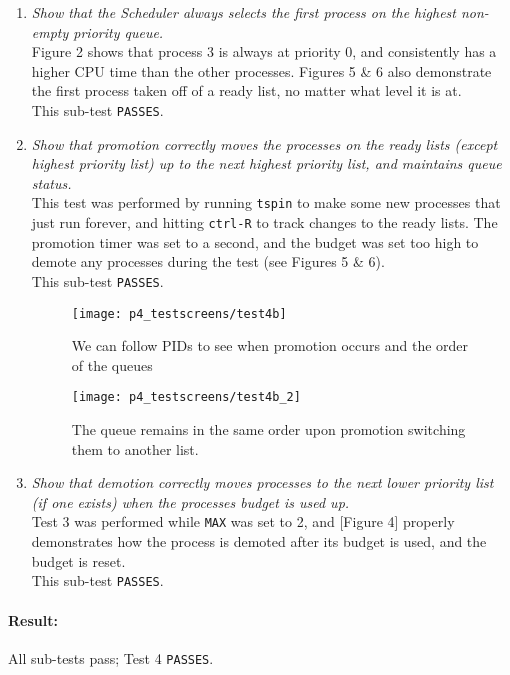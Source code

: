 \documentclass[11pt,letterpaper]{report}
\begin{document}
	\begin{enumerate}
		\item \emph{Show that the Scheduler always selects the first process on the highest non-empty priority queue.}\\
		{\color{red}Figure 2} shows that process 3 is always at priority 0, and consistently has a higher CPU time than the other processes. {\color{red}Figures 5 \& 6} also demonstrate the first process taken off of a ready list, no matter what level it is at.\\
		This sub-test {\tt PASSES}.
		
		\item \emph{Show that promotion correctly moves the processes on the ready lists (except highest priority list) up to the next highest priority list, and maintains queue status.}\\
		This test was performed by running {\tt tspin} to make some new processes that just run forever, and hitting {\tt ctrl-R} to track changes to the ready lists. The promotion timer was set to a second, and the budget was set too high to demote any processes during the test (see {\color{red} Figures 5 \& 6}).\\
		This sub-test {\tt PASSES}.
\begin{figure}
	\centering
	\texttt{[image: p4\_testscreens/test4b]}
	\caption{We can follow PIDs to see when promotion occurs and the order of the queues}
	\label{fig:test4b}
\end{figure}

\begin{figure}
	\centering
	\texttt{[image: p4\_testscreens/test4b\_2]}
	\caption{The queue remains in the same order upon promotion switching them to another list.}
	\label{fig:test4b2}
\end{figure}

		\item \emph{Show that demotion correctly moves processes to the next lower priority list (if one exists) when the processes budget is used up.}\\
		Test 3 was performed while {\tt MAX} was set to 2, and [{\color{red}Figure 4}] properly demonstrates how the process is demoted after its budget is used, and the budget is reset.\\
		This sub-test {\tt PASSES}.
	\end{enumerate}	
	\paragraph{Result:}All sub-tests pass; Test 4 {\tt PASSES}.
\end{document}
